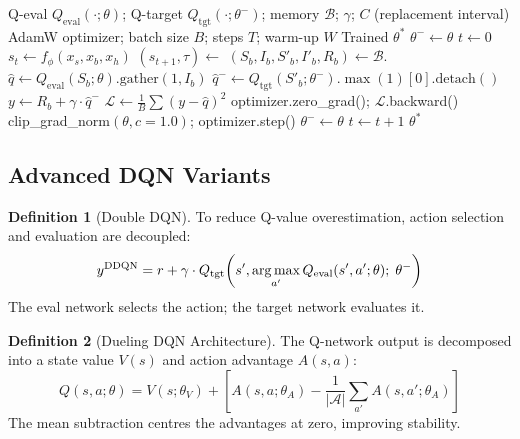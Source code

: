 \documentclass[12pt,a4paper]{article}
\theoremstyle{definition}
\newtheorem{definition}{Definition}[section]
\theoremstyle{plain}
\theoremstyle{remark}
\newcommand{\Loss}{\mathcal{L}}
\newcommand{\argmax}{\operatornamewithlimits{arg\,max}}
\newcommand{\Qeval}{Q_{\text{eval}}}
\newcommand{\Qtgt}{Q_{\text{tgt}}}
\begin{document}
\begin{algorithm}[H]
\caption{Complete DQN Training Loop}
\label{alg:dqn_train}
\begin{algorithmic}[1]
\Require Q-eval $\Qeval(\cdot;\theta)$; Q-target $\Qtgt(\cdot;\theta^-)$; memory $\mathcal{B}$; $\gamma$; $C$ (replacement interval)
\Require AdamW optimizer; batch size $B$; steps $T$; warm-up $W$
\Ensure Trained $\theta^*$
\State $\theta^- \gets \theta$ 
\State $t \gets 0$
  \State $s_t \gets f_\phi(x_s, x_b, x_h)$ 
  \State $(s_{t+1}, \tau) \gets$ \Call{RobotInteract}{$s_t, \Qeval, \varepsilon, \mathcal{B}$}
   
    \State $(S_b, I_b, S'_b, I'_b, R_b) \gets \mathcal{B}$.
    \State $\hat{q} \gets \Qeval(S_b;\theta).\text{gather}(1, I_b)$ 
    \State $\hat{q}^- \gets \Qtgt(S'_b;\theta^-).\max(1)[0].\text{detach}()$ 
    \State $y \gets R_b + \gamma \cdot \hat{q}^-$
    \State $\Loss \gets \frac{1}{B}\sum(y - \hat{q})^2$ 
    \State optimizer.zero\_grad(); $\Loss$.backward()
    \State clip\_grad\_norm$(\theta, c=1.0)$; optimizer.step()
      \State $\theta^- \gets \theta$ 
    \EndIf
  \EndIf
  \State $t \gets t + 1$
\EndWhile
\State \Return $\theta^*$
\end{algorithmic}
\end{algorithm}

\subsection{Advanced DQN Variants}

\begin{definition}[Double DQN]
To reduce Q-value overestimation, action selection and evaluation are decoupled:
\[
  y^{\text{DDQN}} = r + \gamma \cdot \Qtgt\!\left(s', \argmax_{a'} \Qeval(s', a';\theta);\; \theta^-\right)
\]
The eval network selects the action; the target network evaluates it.
\end{definition}

\begin{definition}[Dueling DQN Architecture]
The Q-network output is decomposed into a state value $V(s)$ and action advantage $A(s, a)$:
\[
  Q(s, a; \theta) = V(s; \theta_V) + \left[A(s, a; \theta_A) - \frac{1}{|\mathcal{A}|}\sum_{a'} A(s, a'; \theta_A)\right]
\]
The mean subtraction centres the advantages at zero, improving stability.
\end{definition}
\end{document}
